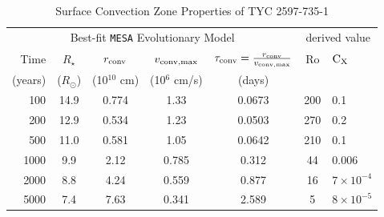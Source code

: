 \documentclass[linenumbers]{aastex631}
\begin{document}
\begin{table}

\caption{Surface Convection Zone Properties of TYC 2597-735-1
	\label{tab:mesa}}
\begin{tabular}{r c c c c | c l}
\hline\hline
\multicolumn{5}{c|}{Best-fit \texttt{MESA} Evolutionary Model} & \multicolumn{2}{c}{derived value} \\
Time & $R_{\star}$ & $r_{\rm conv}$ & $v_{\rm conv, max}$ & $\tau_{\rm conv} = \frac{r_{\rm conv}}{v_{\rm conv, max}}$ & Ro & ${\rm C_X}$ \\
(years)    &    ($R_{\odot}$)   & (10$^{10}$ cm)           & (10$^{6}$ cm/s)        & (days) \\
\hline
%
	100  & 14.9 & 0.774 & 1.33 & 0.0673 & 200 & 0.1  \\
	200  & 12.9 & 0.534 & 1.23 & 0.0503 & 270 & 0.2  \\
	500  & 11.0 & 0.581 & 1.05 & 0.0642 & 210 & 0.1  \\
	1000 & 9.9  & 2.12 & 0.785 & 0.312  & 44 & 0.006  \\
	2000 & 8.8  & 4.24 & 0.559 & 0.877  & 16  & $7\times10^{-4}$\\
	5000 & 7.4  & 7.63 & 0.341 & 2.589  & 5   & $8\times10^{-5}$ \\
\hline
\end{tabular}
\end{table}
\end{document}
